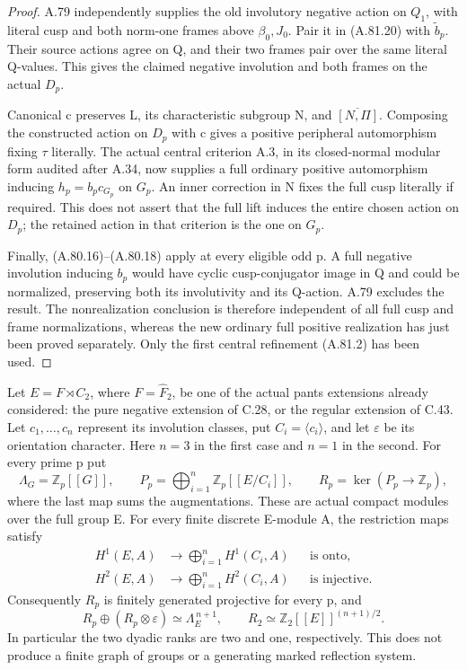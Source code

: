 \begin{proof}
A.79 independently supplies the old involutory
negative action on \(Q_1\), with literal cusp and
both norm-one frames above \(\beta_0,J_0\). Pair
it in (A.81.20) with \(\widetilde b_p\). Their
source actions agree on Q, and their two frames pair
over the same literal Q-values. This gives the
claimed negative involution and both frames on the
actual \(D_p\).

Canonical c preserves L, its characteristic subgroup
N, and \(\overline{[N,\Pi]}\). Composing the
constructed action on \(D_p\) with c gives a
positive peripheral automorphism fixing \(\tau\)
literally. The actual central criterion A.3, in its
closed-normal modular form audited after A.34, now
supplies a full ordinary positive automorphism inducing
\(h_p=b_pc_{G_p}\) on \(G_p\). An inner correction
in N fixes the full cusp literally if required.
This does not assert that the full lift induces the
entire chosen action on \(D_p\); the retained action
in that criterion is the one on \(G_p\).

Finally, (A.80.16)--(A.80.18) apply at every eligible
odd p. A full negative involution inducing \(b_p\)
would have cyclic cusp-conjugator image in Q and
could be normalized, preserving both its involutivity
and its Q-action. A.79 excludes the result. The
nonrealization conclusion is therefore independent
of all full cusp and frame normalizations, whereas
the new ordinary full positive realization has just
been proved separately. Only the first central
refinement (A.81.2) has been used.
\end{proof}


Let \(E=F\rtimes C_2\), where \(F=\widehat F_2\), be
one of the actual pants extensions already considered: the pure
negative extension of C.28, or the regular extension of C.43.
Let \(c_1,\ldots,c_n\) represent its involution classes, put
\(C_i=\langle c_i\rangle\), and let \(\varepsilon\)
be its orientation character. Here \(n=3\) in the first case
and \(n=1\) in the second. For every prime p put
\[
 \Lambda_G=\mathbb Z_p[[G]],\qquad
 P_p=\bigoplus_{i=1}^n\mathbb Z_p[[E/C_i]],\qquad
 R_p=\ker(P_p\longrightarrow\mathbb Z_p),
 \tag{A.82.1}
\]
where the last map sums the augmentations. These are actual
compact modules over the full group E. For every finite discrete
E-module A, the restriction maps satisfy
\[
 \begin{aligned}
 H^1(E,A)&\longrightarrow\bigoplus_{i=1}^n H^1(C_i,A)
                    &&\text{is onto},\\
 H^2(E,A)&\longrightarrow\bigoplus_{i=1}^n H^2(C_i,A)
                    &&\text{is injective}.
 \end{aligned}
 \tag{A.82.2}
\]
Consequently \(R_p\) is finitely generated projective for
every p, and
\[
 R_p\oplus(R_p\otimes\varepsilon)\simeq\Lambda_E^{\,n+1},
 \qquad
 R_2\simeq\mathbb Z_2[[E]]^{(n+1)/2}.
 \tag{A.82.3}
\]
In particular the two dyadic ranks are two and one, respectively.
This does not produce a finite graph of groups or a generating
marked reflection system.

